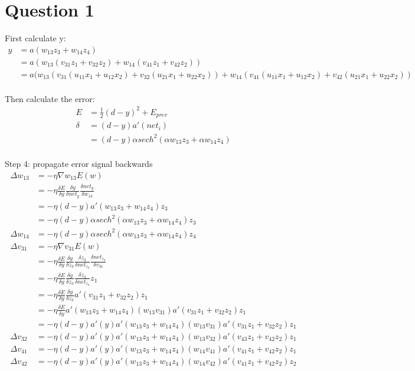 \documentclass[12pt,a4paper]{article}
\begin{document}
\section*{Question 1}
\label{sec:question_1}
First calculate y:
\begin{align*}
	y &= a(w_{13}z_3 + w_{14}z_4)\\
	&= a(w_{13}(v_{31}z_1 +v_{32}z_2) + w_{14}(v_{41}z_1 +v_{42}z_2))\\
	&= a(w_{13}(v_{31}(u_{11}x_1+u_{12}x_2) +v_{32}(u_{21}x_1+u_{22}x_2)) + w_{14}(v_{41}(u_{11}x_1+u_{12}x_2) +v_{42}(u_{21}x_1+u_{22}x_2))\\
\end{align*}

Then calculate the error:
\begin{align*}
	E &= \frac{1}{2}(d-y)^2 + E_{prev}\\
	\delta &= (d-y)a'(net_i)\\
	 &= (d-y)\alpha sech^2(\alpha w_{13}z_3 + \alpha w_{14}z_4)\\
\end{align*}

Step 4: propagate error signal backwards
\begin{align*}
	\Delta w_{13} &= -\eta \nabla w_{13}E(w)\\
	&= -\eta \frac{\delta E}{\delta y} \frac{\delta y}{\delta net_{y}} \frac{\delta net_{y}}{\delta w_{13}}\\
	&= -\eta(d-y)a'(w_{13}z_3+w_{14}z_4)z_3\\
	&= -\eta(d-y)\alpha sech^2(\alpha w_{13}z_3+\alpha w_{14}z_4)z_3\\
	\Delta w_{14}&= -\eta(d-y)\alpha sech^2(\alpha w_{13}z_3+\alpha w_{14}z_4)z_4\\
	\Delta v_{31} &= -\eta \nabla v_{31}E(w)\\
	&= -\eta \frac{\delta E}{\delta y}\frac{\delta y}{\delta z_3}\frac{\delta z_3}{\delta net_{z_3}}\frac{\delta net_{z_3}}{\delta v_{31}}\\
	&= -\eta \frac{\delta E}{\delta y}\frac{\delta y}{\delta z_3}\frac{\delta z_3}{\delta net_{z_3}}z_1\\
	&= -\eta \frac{\delta E}{\delta y}\frac{\delta y}{\delta z_3}a'(v_{31}z_1 + v_{32}z_2)z_1\\
	&= -\eta \frac{\delta E}{\delta y}a'(w_{13}z_3 + w_{14}z_4)(w_{13}v_{31})a'(v_{31}z_1 + v_{32}z_2)z_1\\
	&= -\eta (d-y)a'(y)a'(w_{13}z_3 + w_{14}z_4)(w_{13}v_{31})a'(v_{31}z_1 + v_{32}z_2)z_1\\
	\Delta v_{32} &= -\eta (d-y)a'(y)a'(w_{13}z_3 + w_{14}z_4)(w_{13}v_{32})a'(v_{43}z_1 + v_{42}z_2)z_1\\
	\Delta v_{41} &= -\eta (d-y)a'(y)a'(w_{13}z_3 + w_{14}z_4)(w_{14}v_{41})a'(v_{41}z_1 + v_{42}z_2)z_1\\
	\Delta v_{42} &= -\eta (d-y)a'(y)a'(w_{13}z_3 + w_{14}z_4)(w_{14}v_{42})a'(v_{41}z_1 + v_{42}z_2)z_2\\
\end{align*}
\end{document}
